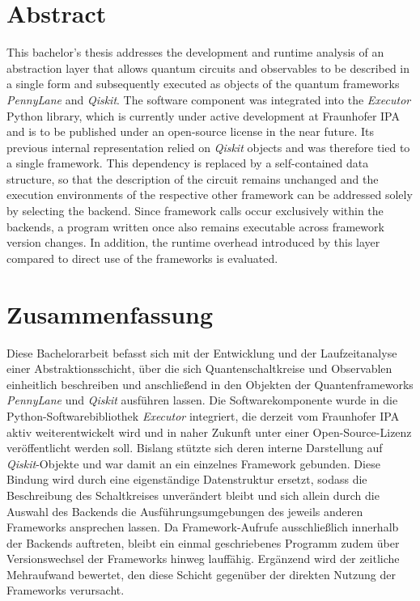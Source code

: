 \chapter*{Abstract}
This bachelor's thesis addresses the development and runtime analysis of an
abstraction layer that allows quantum circuits and observables to be described in a
single form and subsequently executed as objects of the quantum frameworks
\textit{PennyLane} and \textit{Qiskit}. The software component was integrated into
the \textit{Executor} Python library, which is currently under active development at
Fraunhofer IPA and is to be published under an open-source license in the near
future. Its previous internal representation relied on \textit{Qiskit} objects and
was therefore tied to a single framework. This dependency is replaced by a
self-contained data structure, so that the description of the circuit remains
unchanged and the execution environments of the respective other framework can be
addressed solely by selecting the backend. Since framework calls occur exclusively
within the backends, a program written once also remains executable across framework
version changes. In addition, the runtime overhead introduced by this layer compared
to direct use of the frameworks is evaluated.
\cleardoublepage

\chapter*{Zusammenfassung}
Diese Bachelorarbeit befasst sich mit der Entwicklung und der Laufzeitanalyse einer
Abstraktionsschicht, über die sich Quantenschaltkreise und Observablen einheitlich
beschreiben und anschließend in den Objekten der Quantenframeworks
\textit{PennyLane} und \textit{Qiskit} ausführen lassen. Die Softwarekomponente
wurde in die Python-Softwarebibliothek \textit{Executor} integriert, die derzeit vom
Fraunhofer IPA aktiv weiterentwickelt wird und in naher Zukunft unter einer
Open-Source-Lizenz veröffentlicht werden soll. Bislang stützte sich deren interne
Darstellung auf \textit{Qiskit}-Objekte und war damit an ein einzelnes Framework
gebunden. Diese Bindung wird durch eine eigenständige Datenstruktur ersetzt, sodass
die Beschreibung des Schaltkreises unverändert bleibt und sich allein durch die
Auswahl des Backends die Ausführungsumgebungen des jeweils anderen Frameworks
ansprechen lassen. Da Framework-Aufrufe ausschließlich innerhalb der Backends
auftreten, bleibt ein einmal geschriebenes Programm zudem über Versionswechsel der
Frameworks hinweg lauffähig. Ergänzend wird der zeitliche Mehraufwand bewertet, den
diese Schicht gegenüber der direkten Nutzung der Frameworks verursacht.
\cleardoublepage
